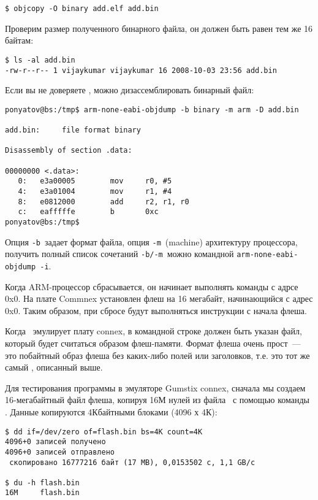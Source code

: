 \begin{verbatim}
$ objcopy -O binary add.elf add.bin
\end{verbatim}

Проверим размер полученного бинарного файла, он должен быть равен тем же 16
байтам:

\begin{verbatim}
$ ls -al add.bin
-rw-r--r-- 1 vijaykumar vijaykumar 16 2008-10-03 23:56 add.bin
\end{verbatim}

Если вы не доверяете , можно дизассемблировать бинарный файл:

\begin{verbatim}
ponyatov@bs:/tmp$ arm-none-eabi-objdump -b binary -m arm -D add.bin

add.bin:     file format binary

Disassembly of section .data:

00000000 <.data>:
   0:   e3a00005        mov     r0, #5
   4:   e3a01004        mov     r1, #4
   8:   e0812000        add     r2, r1, r0
   c:   eafffffe        b       0xc
ponyatov@bs:/tmp$ 
\end{verbatim}
Опция \verb|-b|\ задает формат файла, опция \verb|-m|\ (machine) архитектуру
процессора, получить полный список сочетаний \verb|-b/-m|\ можно командной
\verb|arm-none-eabi-objdump -i|.


Когда ARM-процессор сбрасывается, он начинает выполнять команды с адрсе 0x0.
На плате Commnex установлен флеш на 16 мегабайт, начинающийся с адрес 0x0. Таким
образом, при сбросе будут выполняться инструкции с начала флеша.

Когда \qemu\ эмулирует плату connex, в командной строке должен быть указан файл,
который будет считаться образом флеш-памяти. Формат флеша очень прост\ --- это
побайтный образ флеша без каких-либо полей или заголовков, т.е. это тот же самый
, описанный выше.

Для тестирования программы в эмуляторе Gumstix connex, сначала мы создаем
16-мегабайтный файл флеша, копируя 16М нулей из файла \ с
помощью команды . Данные копируются 4Кбайтными блоками (4096 х 4К):

\begin{verbatim}
$ dd if=/dev/zero of=flash.bin bs=4K count=4K
4096+0 записей получено
4096+0 записей отправлено
 скопировано 16777216 байт (17 MB), 0,0153502 c, 1,1 GB/c

$ du -h flash.bin 
16M     flash.bin
\end{verbatim}

